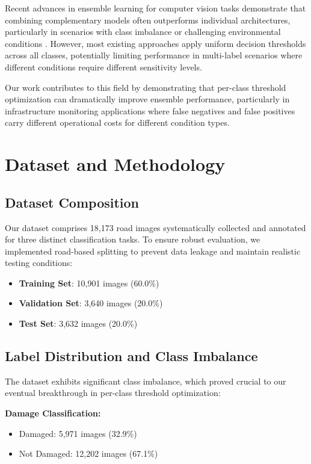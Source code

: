 \documentclass[12pt]{article}
\begin{document}
Recent advances in ensemble learning for computer vision tasks demonstrate that combining complementary models often outperforms individual architectures, particularly in scenarios with class imbalance or challenging environmental conditions \citet{bishop2006pattern}. However, most existing approaches apply uniform decision thresholds across all classes, potentially limiting performance in multi-label scenarios where different conditions require different sensitivity levels.

Our work contributes to this field by demonstrating that per-class threshold optimization can dramatically improve ensemble performance, particularly in infrastructure monitoring applications where false negatives and false positives carry different operational costs for different condition types.

\section{Dataset and Methodology}

\subsection{Dataset Composition}

Our dataset comprises 18,173 road images systematically collected and annotated for three distinct classification tasks. To ensure robust evaluation, we implemented road-based splitting to prevent data leakage and maintain realistic testing conditions:

\begin{itemize}[itemsep=1pt,parsep=0pt,topsep=3pt]
\item \textbf{Training Set}: 10,901 images (60.0\%)
\item \textbf{Validation Set}: 3,640 images (20.0\%)
\item \textbf{Test Set}: 3,632 images (20.0\%)
\end{itemize}

\subsection{Label Distribution and Class Imbalance}

The dataset exhibits significant class imbalance, which proved crucial to our eventual breakthrough in per-class threshold optimization:

\textbf{Damage Classification:}
\begin{itemize}[itemsep=1pt,parsep=0pt,topsep=2pt]
\item Damaged: 5,971 images (32.9\%)
\item Not Damaged: 12,202 images (67.1\%)
\end{itemize}
\end{document}
